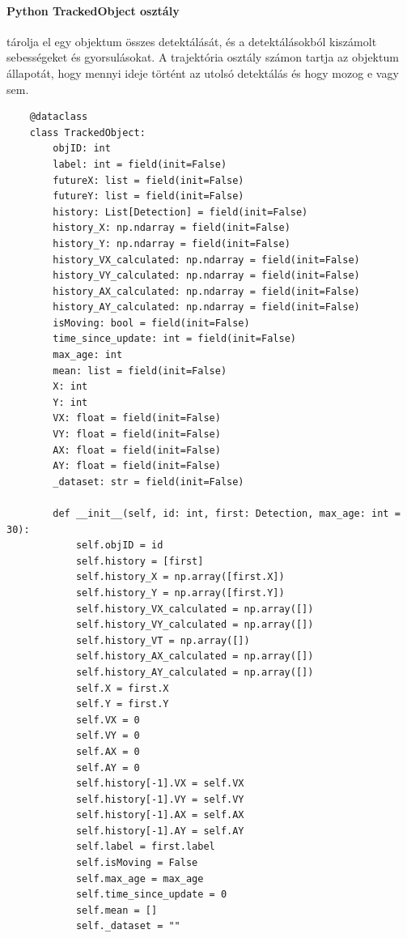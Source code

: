 \documentclass[12pt,a4paper]{article}
\begin{document}
\paragraph{Python TrackedObject osztály} tárolja el egy objektum összes detektálását, és a detektálásokból kiszámolt sebességeket és gyorsulásokat.
A trajektória osztály számon tartja az objektum állapotát, hogy mennyi ideje történt az utolsó detektálás és hogy mozog e vagy sem.
\begin{verbatim}
    @dataclass
    class TrackedObject:
        objID: int
        label: int = field(init=False)
        futureX: list = field(init=False)
        futureY: list = field(init=False)
        history: List[Detection] = field(init=False)
        history_X: np.ndarray = field(init=False)
        history_Y: np.ndarray = field(init=False)
        history_VX_calculated: np.ndarray = field(init=False)
        history_VY_calculated: np.ndarray = field(init=False)
        history_AX_calculated: np.ndarray = field(init=False)
        history_AY_calculated: np.ndarray = field(init=False)
        isMoving: bool = field(init=False)
        time_since_update: int = field(init=False)
        max_age: int
        mean: list = field(init=False)
        X: int
        Y: int
        VX: float = field(init=False)
        VY: float = field(init=False)
        AX: float = field(init=False)
        AY: float = field(init=False)
        _dataset: str = field(init=False)

        def __init__(self, id: int, first: Detection, max_age: int = 30):
            self.objID = id
            self.history = [first]
            self.history_X = np.array([first.X])
            self.history_Y = np.array([first.Y])
            self.history_VX_calculated = np.array([])
            self.history_VY_calculated = np.array([])
            self.history_VT = np.array([])
            self.history_AX_calculated = np.array([])
            self.history_AY_calculated = np.array([])
            self.X = first.X
            self.Y = first.Y
            self.VX = 0
            self.VY = 0
            self.AX = 0
            self.AY = 0
            self.history[-1].VX = self.VX
            self.history[-1].VY = self.VY
            self.history[-1].AX = self.AX
            self.history[-1].AY = self.AY
            self.label = first.label
            self.isMoving = False
            self.max_age = max_age
            self.time_since_update = 0
            self.mean = []
            self._dataset = ""
\end{verbatim}
\end{document}
